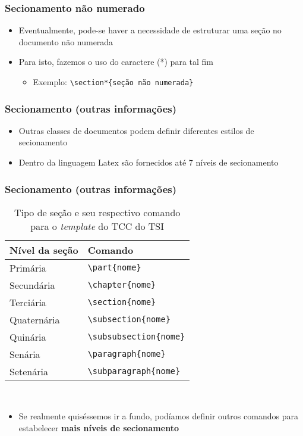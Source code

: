 \begin{frame}[fragile] \frametitle{Secionamento não numerado}
\begin{itemize}
	\item Eventualmente, pode-se haver a necessidade de estruturar uma seção no documento não numerada
	\item Para isto, fazemos o uso do caractere  (*) para tal fim
	\begin{itemize}
		\item Exemplo: \texttt{\textbackslash{}section*\{seção não numerada\}}
	\end{itemize}
\end{itemize}
\end{frame}

\begin{frame}[fragile] \frametitle{Secionamento (outras informações)}
\begin{itemize}
	\item Outras classes de documentos podem definir diferentes estilos de secionamento
	\item Dentro da linguagem Latex são fornecidos até 7 níveis de secionamento
\end{itemize}
\end{frame}

\begin{frame}[fragile] \frametitle{Secionamento (outras informações)}
\begin{table}[!t]
	\centering
	\caption{Tipo de seção e seu respectivo comando para o \textit{template} do TCC do TSI}	
	\begin{tabular}{l|l}
	\hline
		\textbf{Nível da seção} & \textbf{Comando}									\\ \hline
		Primária				& \texttt{\textbackslash{}part\{nome\}}				\\ \hline
		Secundária				& \texttt{\textbackslash{}chapter\{nome\}}			\\ \hline
		Terciária				& \texttt{\textbackslash{}section\{nome\}}			\\ \hline
		Quaternária				& \texttt{\textbackslash{}subsection\{nome\}}		\\ \hline
		Quinária				& \texttt{\textbackslash{}subsubsection\{nome\}}	\\ \hline
		Senária					& \texttt{\textbackslash{}paragraph\{nome\}}		\\ \hline
		Setenária				& \texttt{\textbackslash{}subparagraph\{nome\}}		\\ \hline
	\end{tabular}
	\\ \vspace{0.3cm} \ownsrc
\end{table}

\begin{itemize}
	\item Se realmente quiséssemos ir a fundo, podíamos definir outros comandos para estabelecer \textbf{mais níveis de secionamento}
\end{itemize}
\end{frame}

